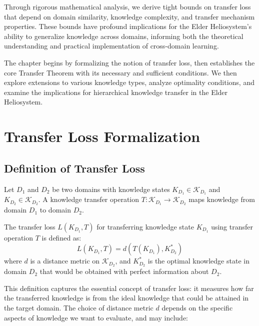 Through rigorous mathematical analysis, we derive tight bounds on transfer loss that depend on domain similarity, knowledge complexity, and transfer mechanism properties. These bounds have profound implications for the Elder Heliosystem's ability to generalize knowledge across domains, informing both the theoretical understanding and practical implementation of cross-domain learning.

The chapter begins by formalizing the notion of transfer loss, then establishes the core Transfer Theorem with its necessary and sufficient conditions. We then explore extensions to various knowledge types, analyze optimality conditions, and examine the implications for hierarchical knowledge transfer in the Elder Heliosystem.

\section{Transfer Loss Formalization}

\subsection{Definition of Transfer Loss}

\begin{definition}
Let $D_1$ and $D_2$ be two domains with knowledge states $K_{D_1} \in \mathcal{K}_{D_1}$ and $K_{D_2} \in \mathcal{K}_{D_2}$. A knowledge transfer operation $T: \mathcal{K}_{D_1} \to \mathcal{K}_{D_2}$ maps knowledge from domain $D_1$ to domain $D_2$.
\end{definition}

\begin{definition}
The transfer loss $L(K_{D_1}, T)$ for transferring knowledge state $K_{D_1}$ using transfer operation $T$ is defined as:
\begin{equation}
L(K_{D_1}, T) = d(T(K_{D_1}), K_{D_2}^*)
\end{equation}
where $d$ is a distance metric on $\mathcal{K}_{D_2}$, and $K_{D_2}^*$ is the optimal knowledge state in domain $D_2$ that would be obtained with perfect information about $D_2$.
\end{definition}

This definition captures the essential concept of transfer loss: it measures how far the transferred knowledge is from the ideal knowledge that could be attained in the target domain. The choice of distance metric $d$ depends on the specific aspects of knowledge we want to evaluate, and may include:

